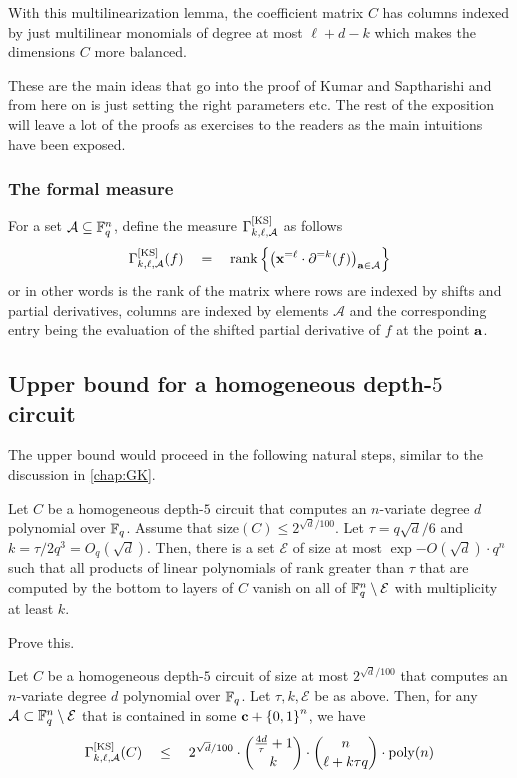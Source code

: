With this multilinearization lemma, the coefficient matrix $C$ has columns indexed by just multilinear monomials of degree at most $\ell + d - k$ which makes the dimensions $C$ more balanced. 

These are the main ideas that go into the proof of Kumar and Saptharishi \cite{KumarSapt15} and from here on is just setting the right parameters etc.
The rest of the exposition will leave a lot of the proofs as exercises to the readers as the main intuitions have been exposed.

\subsubsection*{The formal measure}

For a set $\mathcal{A} \subseteq \mathbb{F}_q^n$, define the measure $\Gamma^{\mathrm{[KS]}}_{k,\ell,\mathcal{A}}$ as follows
\[
\Gamma^{\mathrm{[KS]}}_{k,\ell,\mathcal{A}}(f) \quad = \quad \operatorname{rank} \left\{\left(\mathbf{x}^{= \ell} \cdot \partial^{=k}(f)  \right)_{\mathbf{a} \in \mathcal{A}}\right\}
\]
or in other words is the rank of the matrix where rows are indexed by shifts and partial derivatives, columns are indexed by elements $\mathcal{A}$ and the corresponding entry being the evaluation of the shifted partial derivative of $f$ at the point $\mathbf{a}$.

\subsection{Upper bound for a homogeneous depth-$5$ circuit}

The upper bound would proceed in the following natural steps, similar to the discussion in \ref{chap:GK}. 

\begin{lemma}
  Let $C$ be a homogeneous depth-$5$ circuit that computes an $n$-variate degree $d$ polynomial over $\mathbb{F}_q$.
Assume that $\mathrm{size}(C) \leq 2^{\sqrt{d}/100}$.
Let $\tau = q\sqrt{d}/6$ and $k = \tau / 2q^3 = O_q(\sqrt{d})$.
Then, there is a set $\mathcal{E}$ of size at most $\exp{-O(\sqrt{d})} \cdot q^n$ such that all products of linear polynomials of rank greater than $\tau$ that are computed by the bottom to layers of $C$ vanish on all of $\mathbb{F}_q^n \setminus \mathcal{E}$ with multiplicity at least $k$.
\end{lemma}
\begin{exercise}
Prove this. 
\end{exercise}


\begin{lemma}\label{lem:PSPD-more-upper-bound-ckt}
Let $C$ be a homogeneous depth-$5$ circuit of size at most $2^{\sqrt{d}/100}$ that computes an $n$-variate degree $d$ polynomial over $\mathbb{F}_q$. Let $\tau, k, \mathcal{E}$ be as above. 
Then, for any $\mathcal{A} \subset \mathbb{F}_q^n \setminus \mathcal{E}$ that is contained in some $\mathbf{c} + \left\{0,1\right\}^n$, we have
\[
\Gamma^{\mathrm{[KS]}}_{k,\ell,\mathcal{A}}(C) \quad \leq \quad 2^{\sqrt{d}/100} \cdot \binom{\frac{4d}{\tau} + 1}{k} \cdot \binom{n}{\ell + k\tau q} \cdot \operatorname{poly}(n)
\]
\end{lemma}

